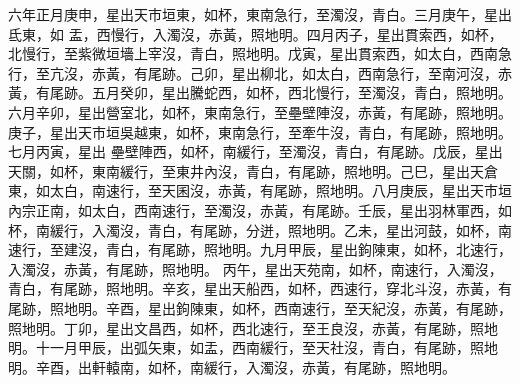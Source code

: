 \begin{pinyinscope}
 六年正月庚申，星出天市垣東，如杯，東南急行，至濁沒，青白。三月庚午，星出氐東，如
 盂，西慢行，入濁沒，赤黃，照地明。四月丙子，星出貫索西，如杯，北慢行，至紫微垣墻上宰沒，青白，照地明。戊寅，星出貫索西，如太白，西南急行，至亢沒，赤黃，有尾跡。己卯，星出柳北，如太白，西南急行，至南河沒，赤黃，有尾跡。五月癸卯，星出騰蛇西，如杯，西北慢行，至濁沒，青白，照地明。六月辛卯，星出營室北，如杯，東南急行，至壘壁陣沒，赤黃，有尾跡，照地明。庚子，星出天市垣吳越東，如杯，東南急行，至牽牛沒，青白，有尾跡，照地明。七月丙寅，星出
 壘壁陣西，如杯，南緩行，至濁沒，青白，有尾跡。戊辰，星出天關，如杯，東南緩行，至東井內沒，青白，有尾跡，照地明。己巳，星出天倉東，如太白，南速行，至天囷沒，赤黃，有尾跡，照地明。八月庚辰，星出天市垣內宗正南，如太白，西南速行，至濁沒，赤黃，有尾跡。壬辰，星出羽林軍西，如杯，南緩行，入濁沒，青白，有尾跡，分迸，照地明。乙未，星出河鼓，如杯，南速行，至建沒，青白，有尾跡，照地明。九月甲辰，星出鉤陳東，如杯，北速行，入濁沒，赤黃，有尾跡，照地明。
 丙午，星出天苑南，如杯，南速行，入濁沒，青白，有尾跡，照地明。辛亥，星出天船西，如杯，西速行，穿北斗沒，赤黃，有尾跡，照地明。辛酉，星出鉤陳東，如杯，西南速行，至天紀沒，赤黃，有尾跡，照地明。丁卯，星出文昌西，如杯，西北速行，至王良沒，赤黃，有尾跡，照地明。十一月甲辰，出弧矢東，如盂，西南緩行，至天社沒，青白，有尾跡，照地明。辛酉，出軒轅南，如杯，南緩行，入濁沒，赤黃，有尾跡，照地明。




\end{pinyinscope}
